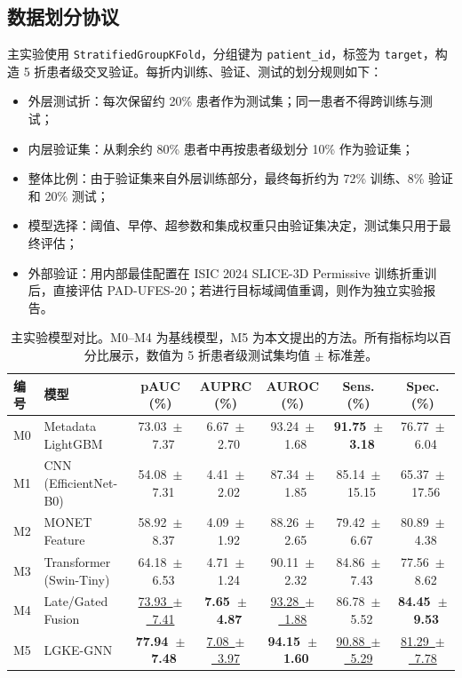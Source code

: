\documentclass[UTF8,a4paper,10pt,twocolumn,fontset=fandol]{ctexart}
\renewcommand{\arraystretch}{1.12}
\newcommand{\isic}{ISIC 2024 SLICE-3D Permissive}
\newcommand{\pad}{PAD-UFES-20}
\newcommand{\modelname}{LGKE-GNN}
\begin{document}
\subsection{数据划分协议}
主实验使用 \texttt{StratifiedGroupKFold}，分组键为 \texttt{patient\_id}，标签为 \texttt{target}，构造 5 折患者级交叉验证。每折内训练、验证、测试的划分规则如下：
\begin{itemize}
    \item 外层测试折：每次保留约 20\% 患者作为测试集；同一患者不得跨训练与测试；
    \item 内层验证集：从剩余约 80\% 患者中再按患者级划分 10\% 作为验证集；
    \item 整体比例：由于验证集来自外层训练部分，最终每折约为 72\% 训练、8\% 验证和 20\% 测试；
    \item 模型选择：阈值、早停、超参数和集成权重只由验证集决定，测试集只用于最终评估；
    \item 外部验证：用内部最佳配置在 \isic{} 训练折重训后，直接评估 \pad{}；若进行目标域阈值重调，则作为独立实验报告。
\end{itemize}
\begin{table}[t]
\centering
\small
\renewcommand{\arraystretch}{1.38}
\setlength{\extrarowheight}{1.5pt}
\setlength{\tabcolsep}{3pt}
\caption{主实验模型对比。M0--M4 为基线模型，M5 为本文提出的方法。所有指标均以百分比展示，数值为 5 折患者级测试集均值 $\pm$ 标准差。}
\label{tab:main_results}

\begin{tabular*}{\textwidth}{@{\extracolsep{\fill}}llccccc}
\toprule
编号 & 模型 & pAUC (\%) & AUPRC (\%) & AUROC (\%) & Sens. (\%) & Spec. (\%) \\
\midrule
M0 & Metadata LightGBM
& \mbox{73.03 $\pm$ 7.37}
& \mbox{6.67 $\pm$ 2.70}
& \mbox{93.24 $\pm$ 1.68}
& \mbox{\textbf{91.75 $\pm$ 3.18}}
& \mbox{76.77 $\pm$ 6.04} \\

M1 & CNN (EfficientNet-B0)
& \mbox{54.08 $\pm$ 7.31}
& \mbox{4.41 $\pm$ 2.02}
& \mbox{87.34 $\pm$ 1.85}
& \mbox{85.14 $\pm$ 15.15}
& \mbox{65.37 $\pm$ 17.56} \\

M2 & MONET Feature
& \mbox{58.92 $\pm$ 8.37}
& \mbox{4.09 $\pm$ 1.92}
& \mbox{88.26 $\pm$ 2.65}
& \mbox{79.42 $\pm$ 6.67}
& \mbox{80.89 $\pm$ 4.38} \\

M3 & Transformer (Swin-Tiny)
& \mbox{64.18 $\pm$ 6.53}
& \mbox{4.71 $\pm$ 1.24}
& \mbox{90.11 $\pm$ 2.32}
& \mbox{84.86 $\pm$ 7.43}
& \mbox{77.56 $\pm$ 8.62} \\

M4 & Late/Gated Fusion
& \mbox{\underline{73.93 $\pm$ 7.41}}
& \mbox{\textbf{7.65 $\pm$ 4.87}}
& \mbox{\underline{93.28 $\pm$ 1.88}}
& \mbox{86.78 $\pm$ 5.52}
& \mbox{\textbf{84.45 $\pm$ 9.53}} \\

M5 & \modelname{}
& \mbox{\textbf{77.94 $\pm$ 7.48}}
& \mbox{\underline{7.08 $\pm$ 3.97}}
& \mbox{\textbf{94.15 $\pm$ 1.60}}
& \mbox{\underline{90.88 $\pm$ 5.29}}
& \mbox{\underline{81.29 $\pm$ 7.78}} \\
\bottomrule
\end{tabular*}
\end{table}
\end{document}
